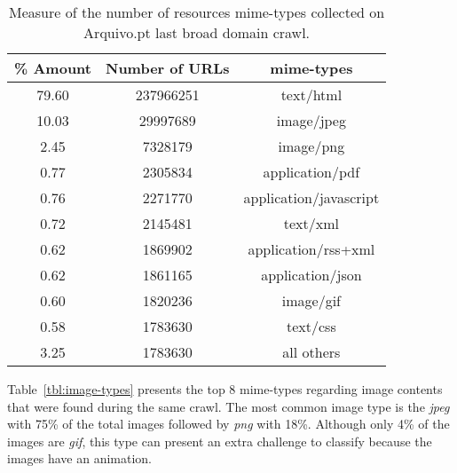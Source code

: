 \begin{table}[H]
\centering
\caption[Resources distribution by mime-type.]{Measure of the number of resources mime-types collected on Arquivo.pt last broad domain crawl.} %
\label{tbl:general-mime-types}
\begin{tabular}{|c|c|c|}
\hline
\textbf{\% Amount}  & \textbf{Number of URLs}   & \textbf{mime-types}               \\ \hline
79.60               &   237966251               & text/html                         \\ \hline
10.03               &   29997689                & image/jpeg                        \\ \hline
2.45                &   7328179                 & image/png                         \\ \hline
0.77                &   2305834                 & application/pdf                   \\ \hline
0.76                &   2271770                 & application/javascript            \\ \hline
0.72                &   2145481                 & text/xml                          \\ \hline
0.62                &   1869902                 & application/rss+xml               \\ \hline
0.62                &   1861165                 & application/json                  \\ \hline
0.60                &   1820236                 & image/gif                         \\ \hline
0.58                &   1783630                 & text/css                          \\ \hline
3.25                &   1783630                 & all others                        \\ \hline
\end{tabular}
\end{table}

Table~\ref{tbl:image-types} presents the top 8 mime-types regarding image contents that were found during the same crawl. The most common image type is the \emph{jpeg} with 75\% of the total images followed by \emph{png} with 18\%. Although only 4\% of the images are \emph{gif}, this type can present an extra challenge to classify because the images have an animation.

